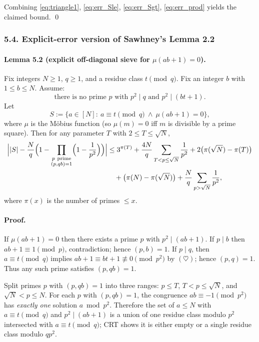 Combining \eqref{eq:triangle1}, \eqref{eq:err_Sle}, \eqref{eq:err_Sgt}, \eqref{eq:err_prod} yields the claimed bound.
\qed

\subsubsection*{5.4. Explicit-error version of Sawhney's Lemma 2.2}
\paragraph{Lemma 5.2 (explicit off-diagonal sieve for $\mu(ab+1)=0$).}
Fix integers $N\ge 1$, $q\ge 1$, and a residue class $t\pmod q$.
Fix an integer $b$ with $1\le b\le N$.
Assume:
\[
\text{there is no prime }p\text{ with }p^2\mid q\text{ and }p^2\mid(bt+1).
\tag{$\heartsuit$}
\]
Let
\[
S:=\{a\in[N]:\ a\equiv t\!\!\pmod q\ \wedge\ \mu(ab+1)=0\},
\]
where $\mu$ is the M\"obius function (so $\mu(m)=0$ iff $m$ is divisible by a prime square).
Then for any parameter $T$ with $2\le T\le \sqrt N$,
\begin{align*}
\Bigl||S|-\frac{N}{q}\Bigl(1-\prod_{\substack{p\ \mathrm{prime}\\(p,qb)=1}}\Bigl(1-\frac{1}{p^2}\Bigr)\Bigr)\Bigr|
&\le 3^{\pi(T)}+\frac{4N}{q}\sum_{T<p\le \sqrt N}\frac{1}{p^2}+2\bigl(\pi(\sqrt N)-\pi(T)\bigr)
\\&\quad +\bigl(\pi(N)-\pi(\sqrt N)\bigr)+\frac{N}{q}\sum_{p>\sqrt N}\frac{1}{p^2},
\end{align*}
where $\pi(x)$ is the number of primes $\le x$.

\paragraph{Proof.}
If $\mu(ab+1)=0$ then there exists a prime $p$ with $p^2\mid (ab+1)$.
If $p\mid b$ then $ab+1\equiv 1\pmod p$, contradiction; hence $(p,b)=1$.
If $p\mid q$, then $a\equiv t\pmod q$ implies $ab+1\equiv bt+1\not\equiv 0\pmod{p^2}$ by $(\heartsuit)$; hence $(p,q)=1$.
Thus any such prime satisfies $(p,qb)=1$.

Split primes $p$ with $(p,qb)=1$ into three ranges: $p\le T$, $T<p\le \sqrt N$, and $\sqrt N<p\le N$.
For each $p$ with $(p,qb)=1$, the congruence $ab\equiv -1\pmod{p^2}$ has \emph{exactly one} solution $a\bmod p^2$.
Therefore the set of $a\le N$ with $a\equiv t\pmod q$ and $p^2\mid(ab+1)$ is a union of one residue class modulo $p^2$ intersected with $a\equiv t\pmod q$; CRT shows it is either empty or a single residue class modulo $qp^2$.

